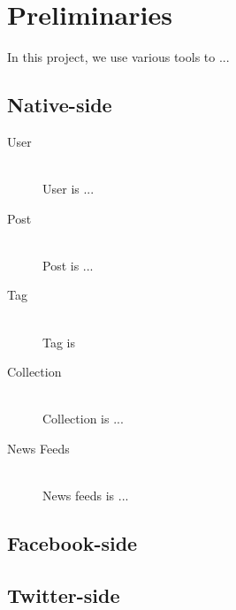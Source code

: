 
%
%

\chapter{Preliminaries}
In this project, we use various tools to ...
\section{Native-side}
\begin{description}
	\item[User] \hfill \\
	User is ...
	\item[Post] \hfill \\
	Post is ...
	\item[Tag] \hfill \\
	Tag is
	\item[Collection] \hfill \\
	Collection is ...
	\item[News Feeds] \hfill \\
	News feeds is ...
\end{description}
\section{Facebook-side}

\section{Twitter-side}


